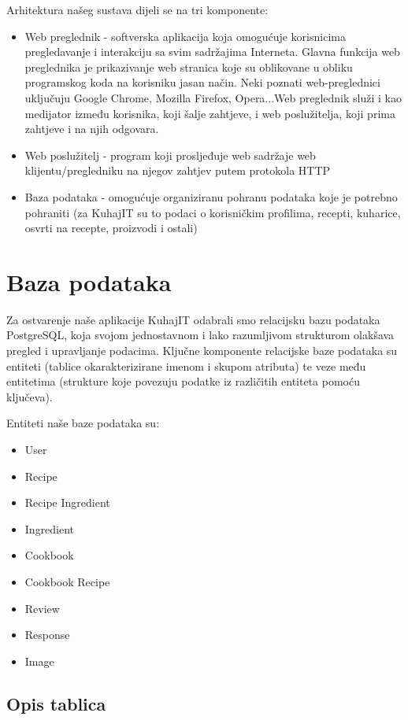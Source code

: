 	Arhitektura našeg sustava dijeli se na tri komponente:
	\begin{itemize}
		\item Web preglednik - softverska aplikacija koja omogućuje korisnicima pregledavanje i interakciju sa svim sadržajima Interneta. Glavna funkcija web preglednika je prikazivanje web stranica koje su oblikovane u obliku programskog koda na korisniku jasan način. Neki poznati web-preglednici uključuju Google Chrome, Mozilla Firefox, Opera...Web preglednik služi i kao medijator između korisnika, koji šalje zahtjeve, i web poslužitelja, koji prima zahtjeve i na njih odgovara.
		\item Web poslužitelj - program koji prosljeđuje web sadržaje web klijentu/pregledniku na njegov zahtjev putem protokola HTTP
		\item Baza podataka - omogućuje organiziranu pohranu podataka koje je potrebno pohraniti (za KuhajIT su to podaci o korisničkim profilima, recepti, kuharice, osvrti na recepte, proizvodi i ostali)
	\end{itemize}
			
		\section{Baza podataka}

		Za ostvarenje naše aplikacije KuhajIT odabrali smo relacijsku bazu podataka PostgreSQL, koja svojom jednostavnom i lako razumljivom strukturom olakšava pregled i upravljanje podacima. Ključne komponente relacijske baze podataka su entiteti (tablice okarakterizirane imenom i skupom atributa) te veze među entitetima (strukture koje povezuju podatke iz različitih entiteta pomoću ključeva).
		
		Entiteti naše baze podataka su:
		\begin{itemize}
			\item User
			\item Recipe
			\item Recipe Ingredient
			\item Ingredient
			\item Cookbook
			\item Cookbook Recipe
			\item Review
			\item Response
			\item Image
		\end{itemize}
		
		
			\subsection{Opis tablica}
				
